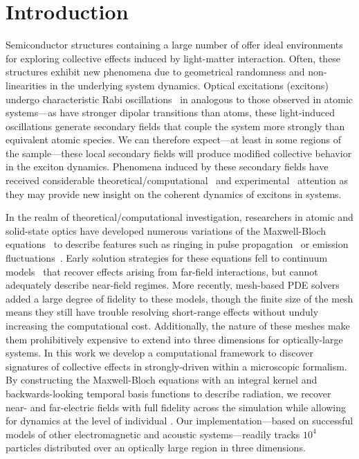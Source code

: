\section{\label{section:introduction}Introduction}

Semiconductor structures containing a large number of \qds{} offer ideal environments for exploring collective effects induced by light-matter interaction.
Often, these structures exhibit new phenomena due to geometrical randomness and non-linearities in the underlying system dynamics.
Optical excitations (excitons) undergo characteristic Rabi oscillations~\cite{Stievater2001,Kamada2001,Htoon2002} in \qds{} analogous to those observed in atomic systems---as \qds{} have stronger dipolar transitions than atoms, these light-induced oscillations generate secondary fields that couple the system more strongly than equivalent atomic species.
We can therefore expect---at least in some regions of the sample---these local secondary fields will produce modified collective behavior in the exciton dynamics.
Phenomena induced by these secondary fields have received considerable theoretical/computational~\cite{Slepyan2002,Slepyan2004} and experimental~\cite{Asakura2013} attention as they may provide new insight on the coherent dynamics of excitons in \qd{} systems.

In the realm of theoretical/computational investigation, researchers in atomic and solid-state optics have developed numerous variations of the Maxwell-Bloch equations~\cite{Gross1982} to describe features such as ringing in pulse propagation~\cite{Burnham1969,MacGillivray1976} or emission fluctuations~\cite{Haake1979}.
Early solution strategies for these equations fell to continuum models~\cite{Rehler1971,MacGillivray1976} that recover effects arising from far-field interactions, but cannot adequately describe near-field regimes.
More recently, mesh-based PDE solvers~\cite{Vanneste2001,Fratalocchi2008,Bachelard2015} added a large degree of fidelity to these models, though the finite size of the mesh means they still have trouble resolving short-range effects without unduly increasing the computational cost.
Additionally, the nature of these meshes make them prohibitively expensive to extend into three dimensions for optically-large systems.
In this work we develop a computational framework to discover signatures of collective effects in strongly-driven \qds{} within a microscopic formalism.
By constructing the Maxwell-Bloch equations with an integral kernel and backwards-looking temporal basis functions to describe radiation, we recover near- and far-electric fields with full fidelity across the simulation while allowing for dynamics at the level of individual \qds{}.
Our implementation---based on successful models of other electromagnetic \cite{otherpapersfromshanker} and acoustic \cite{Glosser2016} systems---readily tracks $10^4$ particles distributed over an optically large region in three dimensions.


